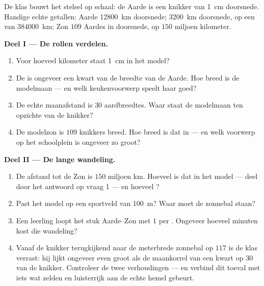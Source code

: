 \begin{problem}\label{pb:g6:sun-earth-moon:1}
De klas bouwt het stelsel op schaal: de Aarde is een knikker van
\qty{1}{cm} doorsnede. Handige echte getallen: Aarde \qty{12800}{km}
doorsnede;  \qty{3200}{km} doorsnede, op een  van
\qty{384000}{km}; Zon $109$ Aardes in doorsnede, op $150$ miljoen
kilometer.

\medskip\noindent\textbf{Deel I --- De rollen verdelen.}
\begin{enumerate}
  \item Voor hoeveel kilometer staat \qty{1}{cm} in het model?
  \item De  is ongeveer een kwart van de breedte van de Aarde.
        Hoe breed is de modelmaan --- en welk keukenvoorwerp speelt
        haar goed?
  \item De echte maanafstand is $30$ aardbreedtes. Waar staat de
        modelmaan ten opzichte van de knikker?
  \item De modelzon is $109$ knikkers breed. Hoe breed is dat in
         --- en welk voorwerp op het schoolplein is ongeveer
        zo groot?
\end{enumerate}

\medskip\noindent\textbf{Deel II --- De lange wandeling.}
\begin{enumerate}[resume]
  \item De afstand tot de Zon is $150$ miljoen km. Hoeveel
         is dat in het model --- deel door het antwoord op
        vraag 1 --- en hoeveel ?
  \item Past het model op een sportveld van \qty{100}{m}? Waar moet
        de zonnebal staan?
  \item Een leerling loopt het stuk Aarde--Zon met $1$  per
        . Ongeveer hoeveel minuten kost die wandeling?
  \item Vanaf de knikker terugkijkend naar de meterbrede zonnebal op
        $117$  is de klas verrast: hij lijkt ongeveer even groot
        als de maankorrel van een kwart  op $30$
         van de knikker. Controleer de twee verhoudingen
        --- en verbind dit toeval met iets wat zelden en luisterrijk
        aan de echte hemel gebeurt.
\end{enumerate}


\end{problem}
